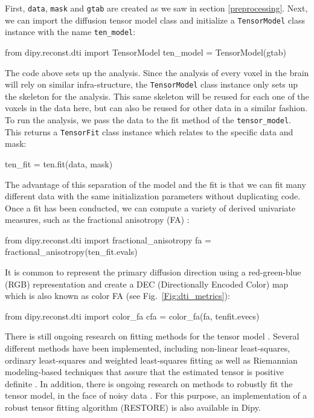 \documentclass{bioinfo}
\begin{document}
First, \texttt{data}, \texttt{mask} and \texttt{gtab} are created as we saw in
section \ref{preprocessing}. Next, we can import the diffusion tensor model class
and initialize a \texttt{TensorModel} class instance with the name
\texttt{ten\_model}:
\begin{python}
from dipy.reconst.dti import TensorModel
ten_model = TensorModel(gtab)
\end{python}
The code above sets up the analysis.  Since
the analysis of every voxel in the brain will rely on similar infra-structure,
the \texttt{TensorModel} class instance only sets up the skeleton for the
analysis. This same skeleton will be reused for each one of the voxels in the
data here, but can also be reused for other data in a similar fashion.  To run
the analysis,
we pass the data to the fit method of the \texttt{tensor\_model}. This returns
a \texttt{TensorFit} class instance which relates to the specific data and
mask:
\begin{python}
ten_fit = ten.fit(data, mask)
\end{python}
The advantage of this separation of the model and the fit is that we can fit
many different data with the same initialization parameters without duplicating
code. Once a fit has been conducted, we can compute a variety of derived
univariate measures, such as the fractional anisotropy (FA) \citep{Basser1996}:
\begin{python}
from dipy.reconst.dti import fractional_anisotropy
fa = fractional_anisotropy(ten_fit.evals)
\end{python}
It is common to represent the primary diffusion direction using a red-green-blue
(RGB) representation and create a DEC (Directionally Encoded Color) map
\citep{pierpaoli-jezzard-etal:96, pajevic-pierpaoli:99} which is also known as
color FA (see Fig.~\ref{Fig:dti_metrics}):
\begin{python}
from dipy.reconst.dti import color_fa
cfa = color_fa(fa, tenfit.evecs)
\end{python}

There is still ongoing research on fitting methods for the tensor model
\citep{Koay2006}. Several different methods have been implemented, including
non-linear least-squares, ordinary least-squares and weighted least-squares
fitting \citep{chung-lu-etal:06} as well as Riemannian modeling-based
techniques that assure that the estimated tensor is positive definite
\citep{lenglet-rousson-etal:jmiv,arsigny-fillard-etal:06}. In
addition, there is ongoing research on
methods to robustly fit the tensor model, in the face of noisy data
\citep{Chang2005, Chang2012}. For this purpose, an implementation of a robust
tensor fitting algorithm (RESTORE) is also available in Dipy.
\end{document}
